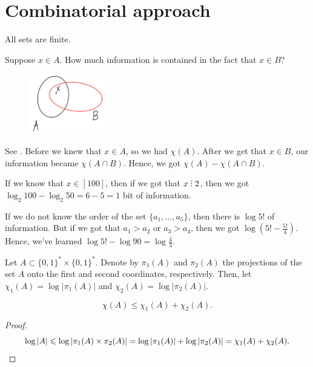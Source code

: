 
\section{Combinatorial approach}

All sets are finite.

\begin{example}
    Suppose $x \in A$.
    How much information is contained in the fact that $x \in B$?
    \begin{figure}[H]
        \centering
        \includegraphics[width=0.3\textwidth]{figures/9268759F-085F-474A-94DD-01FC01C993CA}
        \caption{}
        \label{fig:4cd10f6d-3092-4fca-9f75-1e135943f348}
    \end{figure}

    See .
    Before we knew that $x \in A$, so we had  $\chi(A)$.
    After we get that $x \in B$, our information became $\chi(A \cap B)$.
    Hence, we got $\chi(A) - \chi(A \cap B)$.
\end{example}

\begin{example}
    If we know that $x \in [100]$, then if we got that $x \divby 2$, then we got  $\log_2 100 - \log_2 50 = 6 - 5 = 1$ bit of information.
\end{example}

\begin{example}
    If we do not know the order of the set $\{a_1, \ldots, a_5\}$, then there is $\log 5!$ of information.
    But if we got that $a_1 > a_2$ or $a_3 > a_4$, then we got $\log (5! - \frac{5!}{4})$.
    Hence, we've learned $\log 5! - \log 90 = \log \frac{4}{3}$.
\end{example}

\begin{definition}
    Let $A \subset \{0, 1\}^* \times \{0, 1\}^*$.
    Denote by $\pi_1(A)$ and $\pi_2(A)$ the projections of the set $A$ onto the first and second coordinates, respectively.
    Then, let $\chi_1(A) = \log |\pi_1(A)|$ and $\chi_2(A) = \log |\pi_2(A)|$.
\end{definition}
\begin{theorem}
    \[\chi(A) \leq \chi_1(A) + \chi_2(A).\]
\end{theorem}
\begin{proof}
    \[
        \log |A| \leq \log |\pi_1(A) \times \pi_2(A)| = \log |\pi_1(A)| + \log |\pi_2(A)| = \chi_1(A) + \chi_2(A). \qedhere
    \]
\end{proof}

